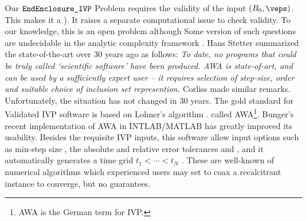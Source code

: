 	Our $\mbox{{\tt EndEnclosure\_IVP}}$ Problem requires the validity 
	of the input $(B_0,\veps)$.  This makes it a 
	\cite{goldreich:promise-problems:06}).
	It raises a separate computational issue to check validity.
	To our knowledge, this is an open problem although 
	Some version of such questions are
	undecidable in the analytic complexity framework
	\cite{graca+2:max-intvl-ivp:09, ko:real:bk}.
	Hans Stetter \cite{stetter:validatedODE:90}
	summarized the state-of-the-art over 30 years ago as follows:
	{\em To date, no programs that could be truly called `scientific
	software' have been produced. 
	AWA is state-of-art, and can be used by a sufficiently expert user --
	it requires selection of step-size, order and suitable choice of
	inclusion set represention.}  
	Corliss \cite[Section 10]{corliss:survey-ode-intvl:89}
	made similar remarks.
	Unfortunately, the situation has not changed in 30 years.
	The gold standard for Validated IVP software is based on
	Lohner's algorithm
	\cite{moore:diffEqn:09,corliss:survey-ode-intvl:89}.
	called AWA\footnote{
		AWA is the German term for IVP.
	}. 
	Bunger's recent implementation \cite{bunger:taylorODE:20}
	of AWA in INTLAB/MATLAB \cite{intlab-ref} has greatly  
	improved its usability.  Besides the requisite IVP
	inputs, this software allow input options
	such as min-step size ,
	the absolute and relative error tolerances 
	and , and it automatically generates
	a time grid $t_1<\cdots<t_N$
	\cite[p.~8]{bunger:taylorODE:20}.
	These are well-known  of
	numerical algorithms which
	experienced users may set to
	coax a recalcitrant instance to converge, but no
	guarantees.


